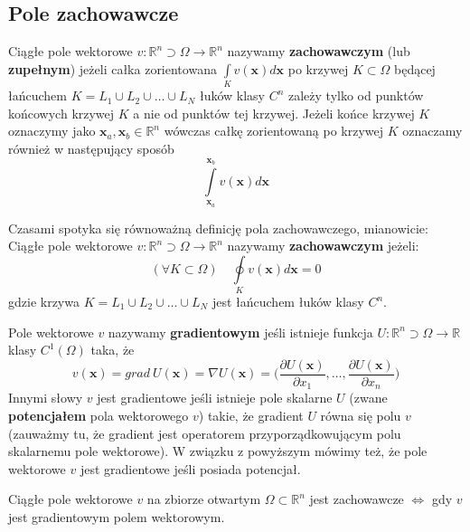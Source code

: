 \subsection{Pole zachowawcze}

\begin{df}
	Ciągłe pole wektorowe $v:\mathbb{R}^{n}\supset\Omega\rightarrow \mathbb{R}^{n}$ nazywamy \textbf{zachowawczym} (lub \textbf{zupełnym}) jeżeli całka zorientowana $\displaystyle\int\limits_{K}v(\mathbf{x})d\mathbf{x}$ po krzywej $K\subset\Omega$ będącej łańcuchem $K=L_1\cup L_2\cup \ldots \cup L_N$ łuków klasy $C^{n}$ zależy tylko od punktów końcowych krzywej $K$ a nie od punktów tej krzywej. Jeżeli końce krzywej $K$ oznaczymy jako $\mathbf{x}_{a}, \mathbf{x}_{b}\in \mathbb{R}^{n}$ wówczas całkę zorientowaną po krzywej $K$ oznaczamy również w następujący sposób $$\int\limits_{\mathbf{x}_{a}}^{\mathbf{x}_{b}}v(\mathbf{x})d\mathbf{x}$$
\end{df}

\begin{uwg}
	Czasami spotyka się równoważną definicję pola zachowawczego, mianowicie:
	\\ Ciągłe pole wektorowe $v:\mathbb{R}^{n}\supset\Omega\rightarrow \mathbb{R}^{n}$ nazywamy \textbf{zachowawczym} jeżeli: $$(\forall K\subset\Omega)\quad \oint\limits_{K}v(\mathbf{x})d\mathbf{x}=0$$ gdzie krzywa $K=L_1\cup L_2\cup \ldots \cup L_N$ jest łańcuchem łuków klasy $C^{n}$.
\end{uwg}

\begin{df}
	Pole wektorowe $v$ nazywamy \textbf{gradientowym} jeśli istnieje funkcja \linebreak[4]$U:\mathbb{R}^{n}\supset\Omega\rightarrow \mathbb{R}$ klasy $C^{1}(\Omega)$ taka, że $$v(\mathbf{x})=grad \ U(\mathbf{x})=\nabla U(\mathbf{x})=\bigg(\frac{\partial U(\mathbf{x})}{\partial x_{1}},\ldots,\frac{\partial U(\mathbf{x})}{\partial x_{n}}\bigg)$$ Innymi słowy $v$ jest gradientowe jeśli istnieje pole skalarne $U$ (zwane \textbf{potencjałem} pola wektorowego $v$) takie, że gradient $U$ równa się polu $v$ (zauważmy tu, że gradient jest operatorem przyporządkowującym polu skalarnemu pole wektorowe). W związku z powyższym mówimy też, że pole wektorowe $v$ jest gradientowe jeśli posiada potencjał.
\end{df}

\begin{tw}
	Ciągłe pole wektorowe $v$ na zbiorze otwartym $\Omega\subset\mathbb{R}^{n}$ jest zachowawcze $\Leftrightarrow$ gdy $v$ jest gradientowym polem wektorowym.
\end{tw}

